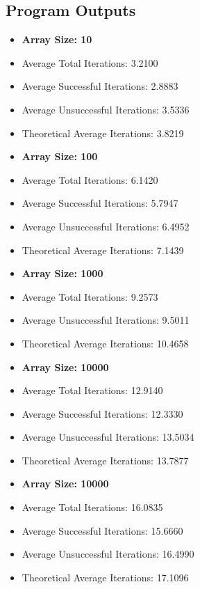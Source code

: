 \documentclass{article}
\begin{document}
\subsection{Program Outputs}
\begin{itemize}
  \item \textbf{Array Size: 10}
  \item Average Total Iterations: 3.2100
  \item Average Successful Iterations: 2.8883
  \item Average Unsuccessful Iterations: 3.5336
  \item Theoretical Average Iterations: 3.8219    
\end{itemize}


\begin{itemize}
    \item \textbf{Array Size: 100}
    \item Average Total Iterations: 6.1420
    \item Average Successful Iterations: 5.7947
    \item Average Unsuccessful Iterations: 6.4952
    \item Theoretical Average Iterations: 7.1439
\end{itemize}



\begin{itemize}
    \item \textbf{Array Size: 1000}
    \item Average Total Iterations: 9.2573
    \item Average Unsuccessful Iterations: 9.5011
    \item   Theoretical Average Iterations: 10.4658
\end{itemize}
  
\begin{itemize}
    \item \textbf{Array Size: 10000}

    \item Average Total Iterations: 12.9140
    \item  Average Successful Iterations: 12.3330
    \item Average Unsuccessful Iterations: 13.5034
    \item   Theoretical Average Iterations: 13.7877
\end{itemize}


\begin{itemize}
    \item \textbf{Array Size: 10000}
    \item Average Total Iterations: 16.0835
    \item Average Successful Iterations: 15.6660
    \item Average Unsuccessful Iterations: 16.4990
    \item   Theoretical Average Iterations: 17.1096
\end{itemize}
  
\end{document}
